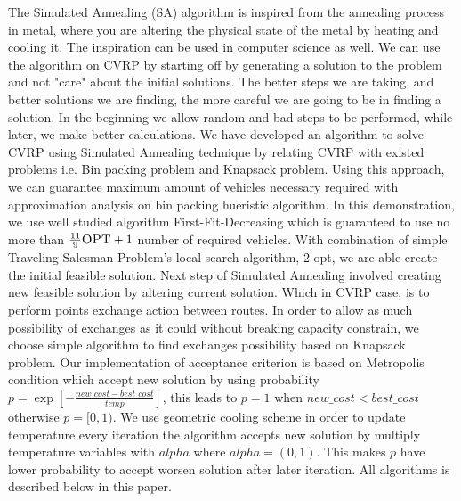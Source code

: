 \documentclass[12pt]{article}
\begin{document}
The Simulated Annealing (SA) algorithm is inspired from the annealing process in metal, where you are altering the physical state of the metal 
by heating and cooling it. The inspiration can be used in computer science as well. We can use the algorithm on CVRP by starting off by generating a solution 
to the problem and not "care" about the initial solutions. The better steps we are taking, and better solutions we are finding, the more careful we are going to be in finding 
a solution. In the beginning we allow random and bad steps to be performed, while later, we make better calculations.
\newline
We have developed an algorithm to solve CVRP using Simulated Annealing technique by relating CVRP with existed problems i.e. Bin packing problem and Knapsack problem. Using this approach, we can guarantee maximum amount of vehicles necessary required with approximation analysis on bin packing hueristic algorithm. In this demonstration, we use well studied  algorithm First-Fit-Decreasing which is guaranteed to use no more than $\frac{11}{9}\textsc{OPT} + 1$ number of required vehicles\cite{FFD}. With combination of simple Traveling Salesman Problem's local search algorithm, 2-opt, we are able create the initial feasible solution. Next step of Simulated Annealing involved creating new feasible solution by altering current solution. Which in CVRP case, is to perform points exchange action between routes. In order to allow as much possibility of exchanges as it could without breaking capacity constrain, we choose simple algorithm to find exchanges possibility based on Knapsack problem. Our implementation of acceptance criterion is based on Metropolis condition which accept new solution by using probability $p = \exp[−\frac{new\_cost − best\_cost}{temp}]$, this leads to $p = 1$ when $new\_cost < best\_cost$ otherwise $p = [0,1)$. We use geometric cooling scheme in order to update temperature every iteration the algorithm accepts new solution by multiply temperature variables with $alpha$ where  $alpha=(0,1)$. This makes $p$ have lower probability to accept worsen solution after later iteration. All algorithms is described below in this paper.
\end{document}
